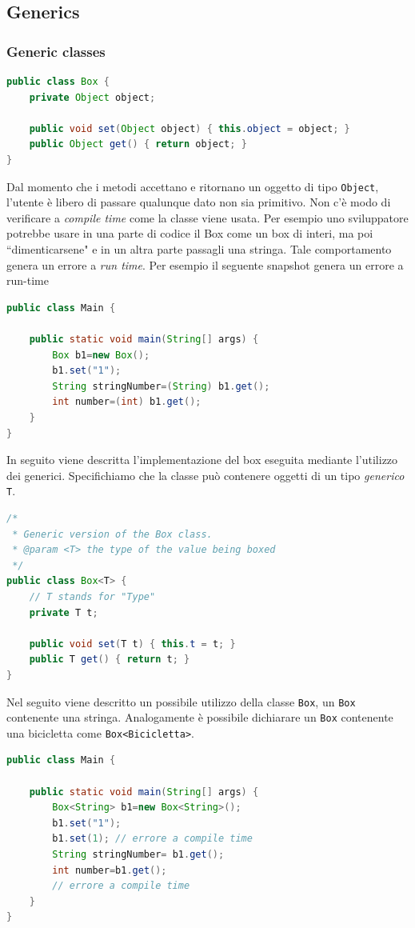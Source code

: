 \documentclass{article}
\begin{document}
\subsection{Generics}
\subsubsection{Generic classes}

\begin{lstlisting}[language=Java]
public class Box {
    private Object object;

    public void set(Object object) { this.object = object; }
    public Object get() { return object; }
}
\end{lstlisting}
Dal momento che i metodi accettano e ritornano un oggetto di tipo \texttt{Object}, l'utente \`e libero di passare qualunque dato non sia primitivo. Non c'\`e modo di verificare a \emph{compile time} come la classe viene usata. Per esempio uno sviluppatore potrebbe usare in una parte di codice il Box come un box di interi, ma poi ``dimenticarsene" e in un altra parte passagli una stringa. Tale comportamento genera un errore a \emph{run time}. Per esempio il seguente snapshot genera un errore a run-time 
\begin{lstlisting}[language=Java]
public class Main {

	public static void main(String[] args) {
		Box b1=new Box();
		b1.set("1");
		String stringNumber=(String) b1.get();
		int number=(int) b1.get();
	}
}
\end{lstlisting}
In seguito viene descritta l'implementazione del box eseguita mediante l'utilizzo dei generici. Specifichiamo che la classe pu\`o contenere oggetti di un tipo \emph{generico} \texttt{T}. 

\begin{lstlisting}[language=Java]
/*
 * Generic version of the Box class.
 * @param <T> the type of the value being boxed
 */
public class Box<T> {
    // T stands for "Type"
    private T t;

    public void set(T t) { this.t = t; }
    public T get() { return t; }
}
\end{lstlisting}
Nel seguito viene descritto un possibile utilizzo della classe \texttt{Box}, un \texttt{Box} contenente una stringa. Analogamente \`e possibile dichiarare un \texttt{Box} contenente una bicicletta come \texttt{Box<Bicicletta>}.
\begin{lstlisting}[language=Java]
public class Main {

	public static void main(String[] args) {
		Box<String> b1=new Box<String>();
		b1.set("1");
		b1.set(1); // errore a compile time
		String stringNumber= b1.get();
		int number=b1.get(); 
		// errore a compile time
	}
}
\end{lstlisting}
\end{document}
